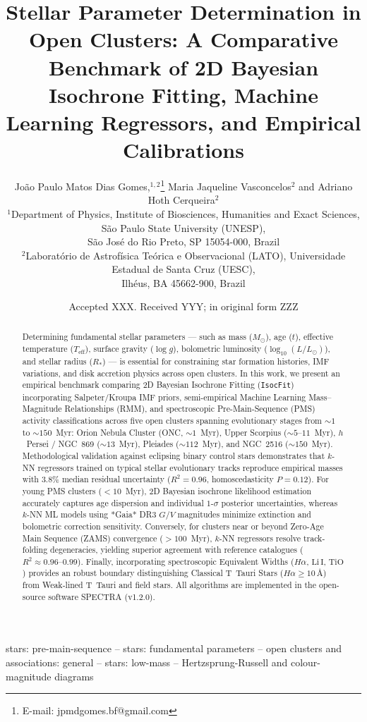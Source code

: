 \documentclass[fleqn,usenatbib]{mnras}
\title[Stellar Parameter Determination in Open Clusters]{Stellar Parameter Determination in Open Clusters: A Comparative Benchmark of 2D Bayesian Isochrone Fitting, Machine Learning Regressors, and Empirical Calibrations}
\author[J. P. M. D. Gomes et al.]{
João Paulo Matos Dias Gomes,$^{1,2}$\thanks{E-mail: jpmdgomes.bf@gmail.com}
Maria Jaqueline Vasconcelos$^{2}$
and Adriano Hoth Cerqueira$^{2}$
\\
$^{1}$Department of Physics, Institute of Biosciences, Humanities and Exact Sciences, São Paulo State University (UNESP),\\
\hspace*{0.2cm}São José do Rio Preto, SP 15054-000, Brazil\\
$^{2}$Laboratório de Astrofísica Teórica e Observacional (LATO), Universidade Estadual de Santa Cruz (UESC),\\
\hspace*{0.2cm}Ilhéus, BA 45662-900, Brazil
}
\date{Accepted XXX. Received YYY; in original form ZZZ}
\begin{document}
\label{firstpage}
\pagerange{\pageref{firstpage}--\pageref{lastpage}}
\maketitle

\begin{abstract}
Determining fundamental stellar parameters --- such as mass ($M_\odot$), age ($t$), effective temperature ($T_{\text{eff}}$), surface gravity ($\log g$), bolometric luminosity ($\log_{10}(L/L_\odot)$), and stellar radius ($R_*$) --- is essential for constraining star formation histories, IMF variations, and disk accretion physics across open clusters. In this work, we present an empirical benchmark comparing 2D Bayesian Isochrone Fitting (\texttt{IsocFit}) incorporating Salpeter/Kroupa IMF priors, semi-empirical Machine Learning Mass--Magnitude Relationships (RMM), and spectroscopic Pre-Main-Sequence (PMS) activity classifications across five open clusters spanning evolutionary stages from $\sim 1$ to $\sim 150$~Myr: Orion Nebula Cluster (ONC, $\sim 1$~Myr), Upper Scorpius ($\sim 5\text{--}11$~Myr), $h$~Persei / NGC~869 ($\sim 13$~Myr), Pleiades ($\sim 112$~Myr), and NGC~2516 ($\sim 150$~Myr). Methodological validation against eclipsing binary control stars demonstrates that $k$-NN regressors trained on typical stellar evolutionary tracks reproduce empirical masses with $3.8\%$ median residual uncertainty ($R^2 = 0.96$, homoscedasticity $P=0.12$). For young PMS clusters ($<10$~Myr), 2D Bayesian isochrone likelihood estimation accurately captures age dispersion and individual $1\text{-}\sigma$ posterior uncertainties, whereas $k$-NN ML models using *Gaia* DR3 $G/V$ magnitudes minimize extinction and bolometric correction sensitivity. Conversely, for clusters near or beyond Zero-Age Main Sequence (ZAMS) convergence ($>100$~Myr), $k$-NN regressors resolve track-folding degeneracies, yielding superior agreement with reference catalogues ($R^2 \approx 0.96\text{--}0.99$). Finally, incorporating spectroscopic Equivalent Widths ($H\alpha$, $\text{Li}\,\text{I}$, $\text{TiO}$) provides an robust boundary distinguishing Classical T~Tauri Stars ($H\alpha \ge 10\,\text{\AA}$) from Weak-lined T~Tauri and field stars. All algorithms are implemented in the open-source software \textsc{SPECTRA} (v1.2.0).
\end{abstract}

\begin{keywords}
stars: pre-main-sequence -- stars: fundamental parameters -- open clusters and associations: general -- stars: low-mass -- Hertzsprung-Russell and colour-magnitude diagrams
\end{keywords}
\end{document}

